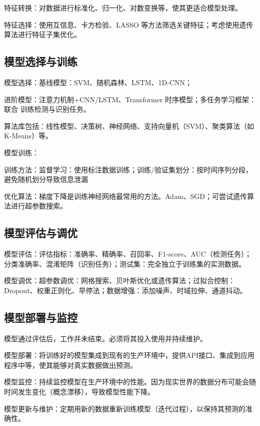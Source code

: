 特征转换：对数据进行标准化、归一化、对数变换等，使其更适合模型处理。

特征选择：使用互信息、卡方检验、LASSO 等方法筛选关键特征；考虑使用遗传算法进行特征子集优化。

\subsection{模型选择与训练}
模型选择：基线模型：SVM、随机森林、LSTM、1D-CNN；

进阶模型：注意力机制+CNN/LSTM、Transformer 时序模型；多任务学习框架：联合 训练检测与识别任务。

算法库包括：线性模型、决策树、神经网络、支持向量机（SVM）、聚类算法（如K-Means）等。

模型训练：

训练方法：监督学习：使用标注数据训练；训练/验证集划分：按时间序列分段，避免随机划分导致信息泄漏

优化算法：梯度下降是训练神经网络最常用的方法。Adam、SGD；可尝试遗传算法进行超参数搜索。

\subsection{模型评估与调优}
模型评估：评估指标：准确率、精确率、召回率、F1-score、AUC（检测任务）；分类准确率、混淆矩阵（识别任务）；测试集：完全独立于训练集的实测数据。

模型调优：超参数调优：网格搜索、贝叶斯优化或遗传算法；过拟合控制：Dropout、权重正则化、早停法；数据增强：添加噪声、时域拉伸、通道抖动。

\subsection{模型部署与监控}
模型通过评估后，工作并未结束。必须将其投入使用并持续维护。

模型部署：将训练好的模型集成到现有的生产环境中，提供API接口、集成到应用程序中等，使其能够对真实数据做出预测。

模型监控：持续监控模型在生产环境中的性能。因为现实世界的数据分布可能会随时间发生变化（概念漂移），导致模型性能下降。

模型更新与维护：定期用新的数据重新训练模型（迭代过程），以保持其预测的准确性。


